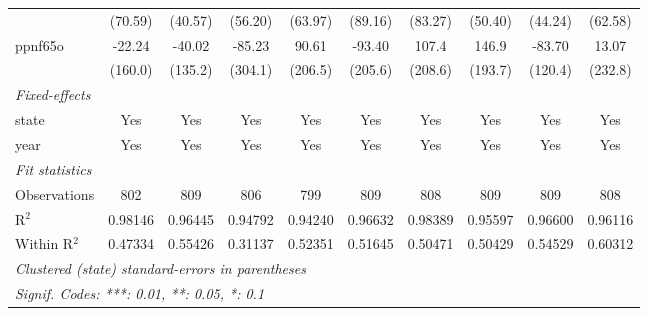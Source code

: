 \begin{table}[htbp]
\begin{tabular}{lccccccccc}
                                     & (70.59)                      & (40.57)                       & (56.20)                     & (63.97)                   & (89.16)                       & (83.27)                      & (50.40)                       & (44.24)                      & (62.58)\\   
      ppnf65o                        & -22.24                       & -40.02                        & -85.23                      & 90.61                     & -93.40                        & 107.4                        & 146.9                         & -83.70                       & 13.07\\   
                                     & (160.0)                      & (135.2)                       & (304.1)                     & (206.5)                   & (205.6)                       & (208.6)                      & (193.7)                       & (120.4)                      & (232.8)\\   
      \midrule
      \emph{Fixed-effects}\\
      state                          & Yes                          & Yes                           & Yes                         & Yes                       & Yes                           & Yes                          & Yes                           & Yes                          & Yes\\  
      year                           & Yes                          & Yes                           & Yes                         & Yes                       & Yes                           & Yes                          & Yes                           & Yes                          & Yes\\  
      \midrule
      \emph{Fit statistics}\\
      Observations                   & 802                          & 809                           & 806                         & 799                       & 809                           & 808                          & 809                           & 809                          & 808\\  
      R$^2$                          & 0.98146                      & 0.96445                       & 0.94792                     & 0.94240                   & 0.96632                       & 0.98389                      & 0.95597                       & 0.96600                      & 0.96116\\  
      Within R$^2$                   & 0.47334                      & 0.55426                       & 0.31137                     & 0.52351                   & 0.51645                       & 0.50471                      & 0.50429                       & 0.54529                      & 0.60312\\  
      \midrule \midrule
      \multicolumn{10}{l}{\emph{Clustered (state) standard-errors in parentheses}}\\
      \multicolumn{10}{l}{\emph{Signif. Codes: ***: 0.01, **: 0.05, *: 0.1}}\\
   \end{tabular}
\end{table}


